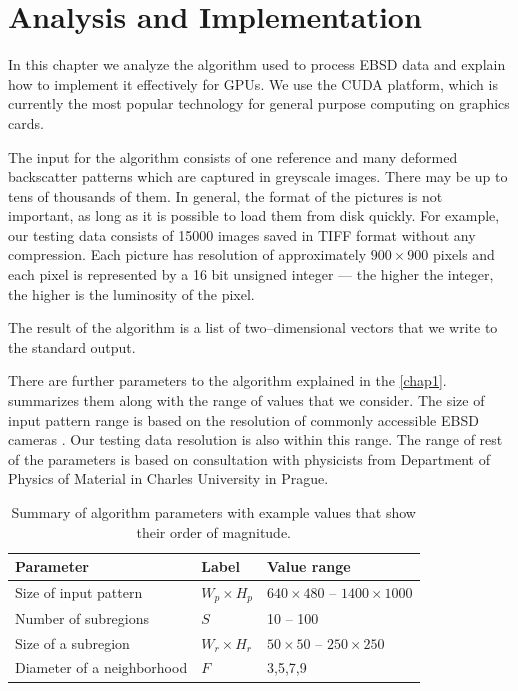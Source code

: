 \chapter{Analysis and Implementation}

In this chapter we analyze the algorithm used to process EBSD data and explain how to implement it effectively for GPUs. We use the CUDA platform, which is currently the most popular technology for general purpose computing on graphics cards.

The input for the algorithm consists of one reference and many deformed backscatter patterns which are captured in greyscale images. There may be up to tens of thousands of them. In general, the format of the pictures is not important, as long as it is possible to load them from disk quickly. For example, our testing data consists of 15000 images saved in TIFF format without any compression. Each picture has resolution of approximately $900 \times 900$ pixels and each pixel is represented by a 16 bit unsigned integer --- the higher the integer, the higher is the luminosity of the pixel.

The result of the algorithm is a list of two--dimensional vectors that we write to the standard output.

There are further parameters to the algorithm explained in the \cref{chap1}.  summarizes them along with the range of values that we consider. The size of input pattern range is based on the resolution of commonly accessible EBSD cameras \cite{digiview-ebsd-camera} \cite{hikari-ebsd-camera}. Our testing data resolution is also within this range. The range of rest of the parameters is based on consultation with physicists from Department of Physics of Material in Charles University in Prague.

\begin{table}[]
	\centering
	\begin{tabular}{@{}lll@{}}
		\toprule
		Parameter                  & Label            &    Value range  \\ \midrule
		Size of input pattern      & $W_p \times H_p$ & $640 \times 480$ -- $1400 \times 1000$  \\
		Number of subregions       & $S$              &               10 -- 100 \\
		Size of a subregion        & $W_r \times H_r$ & $50 \times 50$ -- $250 \times 250$ \\
		Diameter of a neighborhood & $F$              &                3,5,7,9 \\ \bottomrule
	\end{tabular}
	\caption{Summary of algorithm parameters with example values that show their order of magnitude.}
	\label{params}
\end{table}

